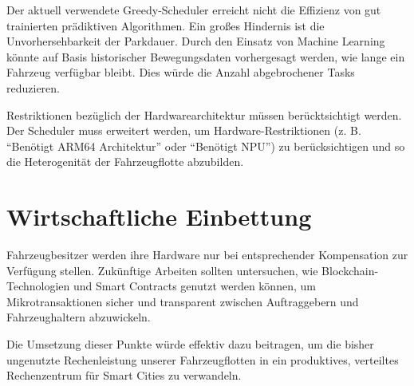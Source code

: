 Der aktuell verwendete Greedy-Scheduler erreicht nicht die Effizienz von gut trainierten prädiktiven Algorithmen. Ein großes Hindernis ist die Unvorhersehbarkeit der Parkdauer. Durch den Einsatz von Machine Learning könnte auf Basis historischer Bewegungsdaten vorhergesagt werden, wie lange ein Fahrzeug verfügbar bleibt. Dies würde die Anzahl abgebrochener Tasks reduzieren.

Restriktionen bezüglich der Hardwarearchitektur müssen berücktsichtigt werden. Der Scheduler muss erweitert werden, um Hardware-Restriktionen (z. B. \enquote{Benötigt ARM64 Architektur} oder \enquote{Benötigt NPU}) zu berücksichtigen und so die Heterogenität der Fahrzeugflotte abzubilden.

\section{Wirtschaftliche Einbettung}

Fahrzeugbesitzer werden ihre Hardware nur bei entsprechender Kompensation zur Verfügung stellen. Zukünftige Arbeiten sollten untersuchen, wie Blockchain-Technologien und Smart Contracts genutzt werden können, um Mikrotransaktionen sicher und transparent zwischen Auftraggebern und Fahrzeughaltern abzuwickeln.

Die Umsetzung dieser Punkte würde effektiv dazu beitragen, um die bisher ungenutzte Rechenleistung unserer Fahrzeugflotten in ein produktives, verteiltes Rechenzentrum für Smart Cities zu verwandeln.